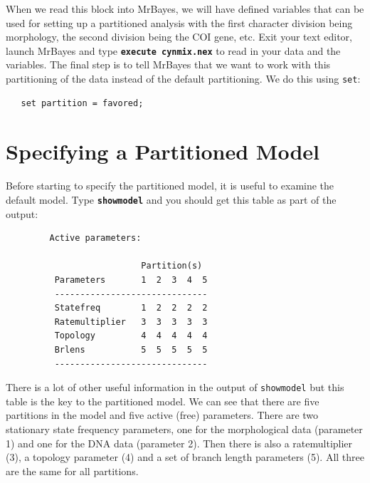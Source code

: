 \documentclass[12pt]{book}
\newcommand{\ttt}[1]{\texttt{#1}}
\newcommand{\tb}[1]{\ttt{\textbf{#1}}}
\begin{document}
When we read this block into MrBayes, we will have defined variables that can be used for setting
up a partitioned analysis with the first character division being morphology, the second division
being the COI gene, etc. Exit your text editor, launch MrBayes and type \tb{execute cynmix.nex}
to read in your data and the variables. The final step is to tell MrBayes that we want to work with
this partitioning of the data instead of the default partitioning. We do this using \ttt{set}:

\begin{singlespacing}\footnotesize
\begin{verbatim}
   set partition = favored;
\end{verbatim}
\normalsize
\end{singlespacing}


\section{Specifying a Partitioned Model}

Before starting to specify the partitioned model, it is useful to examine the default model. Type
\tb{showmodel} and you should get this table as part of the output:~ 

\begin{figure}\singlespacing\footnotesize\vspace{-5mm}
\begin{verbatim}
   Active parameters:

                     Partition(s)
    Parameters       1  2  3  4  5
    ------------------------------
    Statefreq        1  2  2  2  2
    Ratemultiplier   3  3  3  3  3
    Topology         4  4  4  4  4
    Brlens           5  5  5  5  5
    ------------------------------
\end{verbatim}\end{figure}

There is a lot of other useful information in the output of \texttt{showmodel} but this table is the
key to the partitioned model. We can see that there are five partitions in the model and five
active (free) parameters. There are two stationary state frequency parameters, one for the
morphological data (parameter 1) and one for the DNA data (parameter 2). Then there is also a
ratemultiplier (3), a topology parameter (4) and a set of branch length parameters (5). All three
are the same for all partitions.
\end{document}

